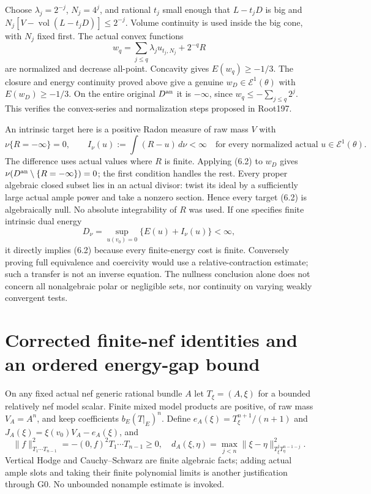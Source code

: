 \documentclass[10pt]{article}
\newcommand{\vol}{\operatorname{vol}}
\newcommand{\E}{\mathcal E}
\begin{document}
Choose $\lambda_j=2^{-j}$, $N_j=4^j$, and rational $t_j$ small enough that
$L-t_jD$ is big and $N_j[V-\vol(L-t_jD)]\leq2^{-j}$.
Volume continuity is used inside the big cone, with $N_j$ fixed first.
The actual convex functions
\[
 w_q=\sum_{j\leq q}\lambda_j u_{t_j,N_j}+2^{-q}R
\]
are normalized and decrease all-point. Concavity gives $E(w_q)\geq-1/3$.
The closure and energy continuity proved above give a genuine
$w_D\in\E^1(\theta)$ with $E(w_D)\geq-1/3$. On the entire original
$D^{\rm an}$ it is $-\infty$, since
$w_q\leq-\sum_{j\leq q}2^j$. This verifies the convex-series and
normalization steps proposed in Root197.

An intrinsic target here is a positive Radon measure of raw mass $V$ with
\[
 \nu\{R=-\infty\}=0,\qquad
 I_\nu(u):=\int(R-u)\,d\nu<\infty
 \quad\text{for every normalized actual }u\in\E^1(\theta).
\tag{6.2}
\]
The difference uses actual values where $R$ is finite. Applying (6.2) to
$w_D$ gives $\nu(D^{\rm an}\setminus\{R=-\infty\})=0$; the first
condition handles the rest. Every proper algebraic closed subset lies
in an actual divisor: twist its ideal by a sufficiently large actual
ample power and take a nonzero section. Hence every target (6.2) is
algebraically null. No absolute integrability of $R$ was used.
If one specifies finite intrinsic dual energy
\[
 D_\nu=\sup_{u(v_0)=0}\{E(u)+I_\nu(u)\}<\infty,
\tag{6.3}
\]
it directly implies (6.2) because every finite-energy cost is finite.
Conversely proving full equivalence and coercivity would use a
relative-contraction estimate; such a transfer is not an inverse equation.
The nullness conclusion alone does not concern all nonalgebraic polar or
negligible sets, nor continuity on varying weakly convergent tests.

\section{Corrected finite-nef identities and an ordered energy-gap bound}
On any fixed actual nef generic rational bundle $A$ let $T_\xi=(A,\xi)$
for a bounded relatively nef model scalar. Finite mixed model products
are positive, of raw mass $V_A=A^n$, and keep coefficients
$b_E(T|_E)^n$. Define $e_A(\xi)=T_\xi^{n+1}/(n+1)$ and
$J_A(\xi)=\xi(v_0)V_A-e_A(\xi)$, and
\[
 \|f\|_{T_1\cdots T_{n-1}}^2=-(0,f)^2T_1\cdots T_{n-1}\geq0,
 \quad d_A(\xi,\eta)=\max_{j<n}\|\xi-\eta\|_{T_\xi^jT_\eta^{n-1-j}}^2.
\]
Vertical Hodge and Cauchy--Schwarz are finite algebraic facts; adding
actual ample slots and taking their finite polynomial limits is another
justification through G0. No unbounded nonample estimate is invoked.
\end{document}
